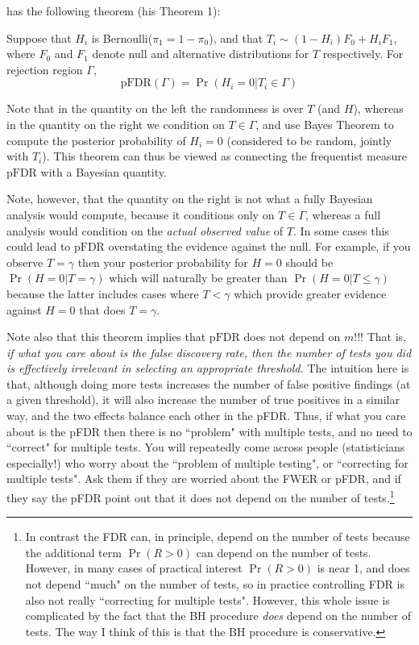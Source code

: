 \documentclass[times,11pt]{article}
\def\pFDR{\text{pFDR}}
\begin{document}
\cite{storey.03} has the following theorem (his Theorem 1):

Suppose that $H_i$ is Bernoulli($\pi_1=1-\pi_0$),
and that $T_i \sim (1-H_i) F_0 + H_i F_1$, where $F_0$ and $F_1$ denote null and alternative distributions for $T$ respectively.  For rejection region $\Gamma$,
\begin{equation}
\pFDR(\Gamma) = \Pr(H_i=0 | T_i \in \Gamma)
\end{equation}

Note that in the quantity on the left the randomness is over $T$ (and $H$), whereas in the quantity on the right we condition on $T \in \Gamma$, and use Bayes Theorem to compute the posterior probability of $H_i=0$ (considered to be random, jointly with $T_i$). This theorem can thus
be viewed as connecting the frequentist measure $\pFDR$ with a Bayesian quantity. 

Note, however, that the quantity on the right is not what a fully Bayesian analysis would compute, because it conditions only on $T \in \Gamma$, whereas a full analysis would condition on the {\it actual observed value} of $T$. In some cases this could lead to $\pFDR$ overstating the evidence against the null. For example, if you observe $T=\gamma$ then your
posterior probability for $H=0$ should be $\Pr(H=0 | T=\gamma)$ which will naturally be greater than $\Pr(H=0 | T \leq \gamma)$ because the latter includes cases where $T<\gamma$ which provide greater evidence against $H=0$ that does $T=\gamma$.

Note also that this theorem implies that $\pFDR$ does not depend on $m$!!! That is, {\it if what you care about is the false discovery rate, then the number of tests you did is effectively irrelevant in selecting an appropriate threshold.} The intuition here is that, although doing more tests increases the number of false positive findings (at a given threshold), it will also increase the number of true positives in a similar way, and the two effects balance each other in the pFDR. Thus, if what you care about is the pFDR then there is no ``problem" with multiple tests, and no need to ``correct" for multiple tests. You will repeatedly come across people (statisticians especially!) who worry about the ``problem of multiple testing", or ``correcting for multiple tests". Ask them if they are worried about the FWER or pFDR, and if they say the pFDR point out that it does not depend on the number of tests.\footnote{In contrast the FDR can, in principle, depend on the number of tests because the additional term $\Pr(R>0)$ can depend on the number of tests. However, in many cases of practical interest $\Pr(R>0)$ is near 1, and does not depend ``much" on the number of tests, so in practice controlling FDR is also not really ``correcting for multiple tests". However, this whole issue is complicated by the fact that the BH procedure {\it does} depend on the number of tests. The way I think of this is that the BH procedure is conservative.}
\end{document}

